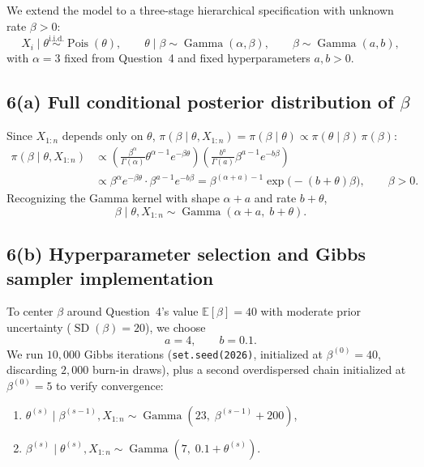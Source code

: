 \documentclass[11pt,a4paper]{article}
\begin{document}
We extend the model to a three-stage hierarchical specification with unknown rate $\beta > 0$:
\[
X_i \mid \theta \stackrel{\text{i.i.d.}}{\sim} \operatorname{Pois}(\theta), \qquad
\theta \mid \beta \sim \operatorname{Gamma}(\alpha, \beta), \qquad
\beta \sim \operatorname{Gamma}(a, b),
\]
with $\alpha = 3$ fixed from Question~4 and fixed hyperparameters $a, b > 0$.

\subsection*{6(a) Full conditional posterior distribution of $\beta$}

Since $X_{1:n}$ depends only on $\theta$, $\pi(\beta \mid \theta, X_{1:n}) = \pi(\beta \mid \theta) \propto \pi(\theta \mid \beta)\,\pi(\beta)$:
\begin{align*}
\pi(\beta \mid \theta, X_{1:n})
&\propto \left(\frac{\beta^\alpha}{\Gamma(\alpha)} \theta^{\alpha - 1} e^{-\beta\theta}\right)
         \left(\frac{b^a}{\Gamma(a)} \beta^{a - 1} e^{-b\beta}\right) \\
&\propto \beta^\alpha e^{-\beta\theta} \cdot \beta^{a - 1} e^{-b\beta}
= \beta^{(\alpha + a) - 1} \exp\!\bigl(-(b + \theta)\beta\bigr), \qquad \beta > 0.
\end{align*}
Recognizing the Gamma kernel with shape $\alpha + a$ and rate $b + \theta$,
\[
\boxed{\beta \mid \theta, X_{1:n} \sim \operatorname{Gamma}(\alpha + a,\; b + \theta).}
\]

\subsection*{6(b) Hyperparameter selection and Gibbs sampler implementation}

To center $\beta$ around Question~4's value $\mathbb{E}[\beta] = 40$ with moderate prior uncertainty ($\operatorname{SD}(\beta) = 20$), we choose
\[
\boxed{a = 4, \qquad b = 0.1.}
\]
We run $10{,}000$ Gibbs iterations (\texttt{set.seed(2026)}, initialized at $\beta^{(0)} = 40$, discarding $2{,}000$ burn-in draws), plus a second overdispersed chain initialized at $\beta^{(0)} = 5$ to verify convergence:
\begin{enumerate}
    \item $\theta^{(s)} \mid \beta^{(s-1)}, X_{1:n} \sim \operatorname{Gamma}(23,\; \beta^{(s-1)} + 200)$,
    \item $\beta^{(s)} \mid \theta^{(s)}, X_{1:n} \sim \operatorname{Gamma}(7,\; 0.1 + \theta^{(s)})$.
\end{enumerate}
\end{document}
